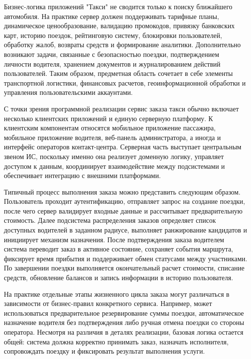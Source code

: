 {	\par \redline Бизнес-логика приложений "Такси"{} не сводится только к поиску ближайшего автомобиля. На практике сервер должен поддерживать тарифные планы, динамическое ценообразование, валидацию промокодов, привязку банковских карт, историю поездок, рейтинговую систему, блокировки пользователей, обработку жалоб, возвраты средств и формирование аналитики. Дополнительно возникают задачи, связанные с безопасностью поездки, подтверждением личности водителя, хранением документов и журналированием действий пользователей. Таким образом, предметная область сочетает в себе элементы транспортной логистики, финансовых расчетов, геоинформационной обработки и управления пользовательскими аккаунтами.
	
	\par \redline С точки зрения программной реализации сервис заказа такси обычно включает несколько клиентских приложений и единую серверную платформу. К клиентским компонентам относятся мобильное приложение пассажира, мобильное приложение водителя, веб-панель администратора, а иногда и интерфейс операторов контакт-центра. Серверная часть выступает центральным звеном ИС, поскольку именно она реализует доменную логику, управляет доступом к данным, координирует взаимодействие между подсистемами и обеспечивает интеграцию с внешними платформами.
	
	\par \redline Типичный процесс выполнения заказа можно представить следующим образом. Пользователь проходит аутентификацию, отправляет запрос на создание поездки, после чего сервер валидирует входные данные и рассчитывает предварительную стоимость. Далее подсистема распределения заказов определяет список доступных водителей в заданном радиусе, выполняет ранжирование кандидатов и инициирует механизм назначения. После подтверждения заказа водителем система переводит заказ в активное состояние, сохраняет события маршрута, фиксирует время прибытия и поддерживает обмен статусами между участниками. По завершении поездки выполняется окончательный расчет стоимости, списание средств, обновление балансов и запись информации в историю пользователя.
	
	\par \redline На практике отдельные этапы жизненного цикла заказа могут различаться в зависимости от бизнес-правил конкретного сервиса. Например, может использоваться предварительное резервирование суммы поездки, автоматическое назначение водителя без подтверждения либо ручная отмена поездки со стороны оператора. Несмотря на различия в деталях реализации, базовая логика остается общей: система должна корректно принимать заказ, назначать исполнителя, сопровождать поездку и фиксировать результат выполнения услуги.
	
}
